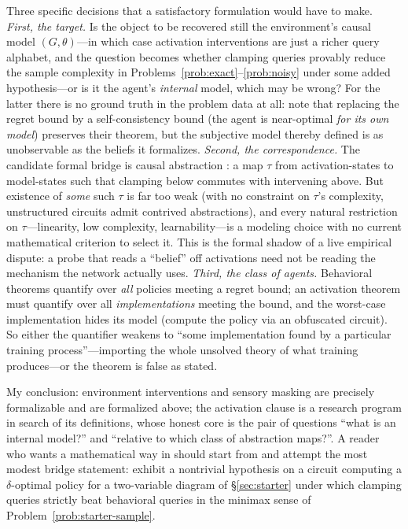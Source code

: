 \documentclass[11pt]{amsart}
\theoremstyle{plain}
\theoremstyle{definition}
\begin{document}
Three specific decisions that a satisfactory formulation would have to make. \emph{First, the target.} Is the object to be recovered still the environment's causal model $(G,\theta)$---in which case activation interventions are just a richer query alphabet, and the question becomes whether clamping queries provably reduce the sample complexity in Problems~\ref{prob:exact}--\ref{prob:noisy} under some added hypothesis---or is it the agent's \emph{internal} model, which may be wrong? For the latter there is no ground truth in the problem data at all: \cite{richens2025} note that replacing the regret bound by a self-consistency bound (the agent is near-optimal \emph{for its own model}) preserves their theorem, but the subjective model thereby defined is as unobservable as the beliefs it formalizes. \emph{Second, the correspondence.} The candidate formal bridge is causal abstraction \cite{geiger2021,rubenstein2017}: a map $\tau$ from activation-states to model-states such that clamping below commutes with intervening above. But existence of \emph{some} such $\tau$ is far too weak (with no constraint on $\tau$'s complexity, unstructured circuits admit contrived abstractions), and every natural restriction on $\tau$---linearity, low complexity, learnability---is a modeling choice with no current mathematical criterion to select it. This is the formal shadow of a live empirical dispute: a probe that reads a ``belief'' off activations \cite{li2023} need not be reading the mechanism the network actually uses. \emph{Third, the class of agents.} Behavioral theorems quantify over \emph{all} policies meeting a regret bound; an activation theorem must quantify over all \emph{implementations} meeting the bound, and the worst-case implementation hides its model (compute the policy via an obfuscated circuit). So either the quantifier weakens to ``some implementation found by a particular training process''---importing the whole unsolved theory of what training produces---or the theorem is false as stated.

My conclusion: environment interventions and sensory masking are precisely formalizable and are formalized above; the activation clause is a research program in search of its definitions, whose honest core is the pair of questions ``what is an internal model?'' and ``relative to which class of abstraction maps?''. A reader who wants a mathematical way in should start from \cite{geiger2021,rubenstein2017} and attempt the most modest bridge statement: exhibit a nontrivial hypothesis on a circuit computing a $\delta$-optimal policy for a two-variable diagram of \S\ref{sec:starter} under which clamping queries strictly beat behavioral queries in the minimax sense of Problem~\ref{prob:starter-sample}.
\end{document}
